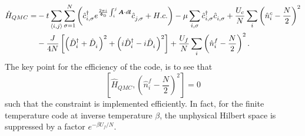 \begin{align}
	\hat{H}_{QMC}      =  &   - t  \sum_{\langle i,j \rangle}    \sum_{\sigma=1}^{N}  \left(  \hat{c}^{\dagger}_{i,\sigma}  e^{\frac{2\pi i}{\Phi_0}  \int_{i}^{j} \ve{A}\cdot d \ve{l}}\hat{c}^{\phantom\dagger}_{j,\sigma}   + H.c.  \right)  - \mu \sum_{i,\sigma} \hat{c}^{\dagger}_{i,\sigma}  \hat{c}^{\phantom\dagger}_{i,\sigma} 
	+    \frac{U_c}{N}  \sum_{i}   \left( \hat{n}^c_i -  \frac{N}{2} \right)^2   \nonumber \\
          & -  \frac{J}{4N}    \left[ \left(   \hat{D}^{\dagger}_{i}  + \hat{D}^{\phantom\dagger}_{i}    \right)^{2}  + 
                                                       \left(  i\hat{D}^{\dagger}_{i}  - i  \hat{D}^{\phantom\dagger}_{i}    \right)^2  \right]  
       +    \frac{U_f}{N}  \sum_{i}   \left( \hat{n}^f_i -  \frac{N}{2} \right)^2.
\label{Kondo_SUN_Ham_QMC.eq}
\end{align}
The key point for the efficiency of the code, is to  see that 
\begin{equation}
	\left[   \hat{H}_{QMC},  \left( \hat{n}^f_i -  \frac{N}{2} \right)^2  \right]    = 0 
\label{Constraint_KLM.eq}
\end{equation}
such that the  constraint is implemented  efficiently.  In fact, for the finite temperature code  at inverse temperature $\beta$,  the unphysical Hilbert space   is suppressed by a  
factor  $e^{- \beta U_f/N} $. 






